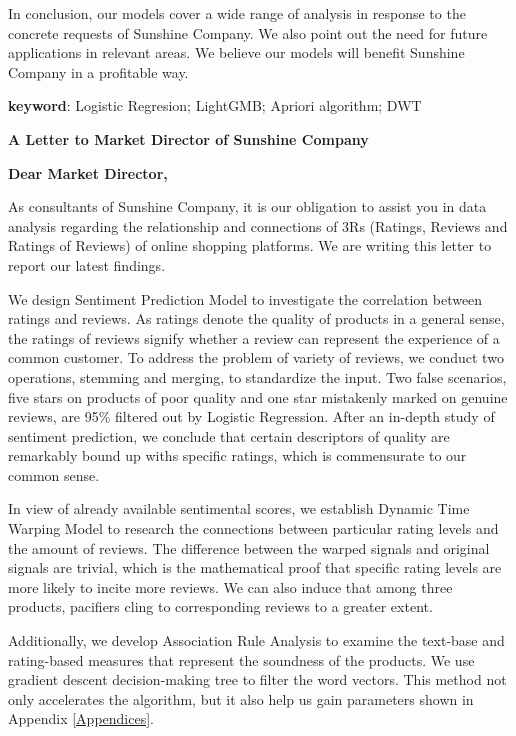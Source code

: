 \documentclass[12pt]{article}%
\begin{document}
In conclusion, our models cover a wide range of analysis in response to the concrete requests of Sunshine Company. We also point out the need for future applications in relevant areas. We believe our models will benefit Sunshine Company in a profitable way.

\vspace{7pt}
\textbf{keyword}: Logistic Regresion; LightGMB; Apriori algorithm; DWT


\fontsize{13}{12.5}\selectfont
\setmainfont{TeX Gyre Pagella}    
\newpage
\thispagestyle{empty}
{\Large \textbf{A Letter to Market Director of Sunshine Company
}}
\vspace{6pt}
	
{\large \textbf{Dear Market Director,}}
	\vspace{10pt}
	
As consultants of Sunshine Company, it is our obligation to assist you in data analysis regarding the relationship and connections of 3Rs (Ratings, Reviews and Ratings of Reviews) of online shopping platforms. We are writing this letter to report our latest findings.

We design Sentiment Prediction Model to investigate the correlation between ratings and reviews. As ratings denote the quality of products in a general sense, the ratings of reviews signify whether a review can represent the experience of a common customer. To address the problem of variety of reviews, we conduct two operations, stemming and merging, to standardize the input. Two false scenarios, five stars on products of poor quality and one star mistakenly marked on genuine reviews, are 95\% filtered out by Logistic Regression. After an in-depth study of sentiment prediction, we conclude that certain descriptors of quality are remarkably bound up withs specific ratings, which is commensurate to our common sense.

In view of already available sentimental scores, we establish Dynamic Time Warping Model to research the connections between particular rating levels and the amount of reviews. The difference between the warped signals and original signals are trivial, which is the mathematical proof that specific rating levels are more likely to incite more reviews. We can also induce that among three products, pacifiers cling to corresponding reviews to a greater extent.

 Additionally, we develop Association Rule Analysis to examine the text-base and rating-based measures that represent the soundness of the products. We use gradient descent decision-making tree to filter the word vectors. This method not only accelerates the algorithm, but it also help us gain parameters shown in Appendix \ref{Appendices}.
\end{document}
